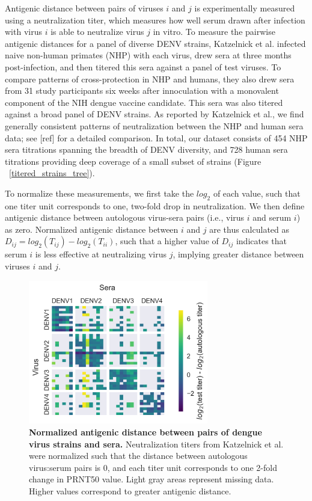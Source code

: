 \documentclass[11pt,oneside,letterpaper]{article}
\begin{document}
Antigenic distance between pairs of viruses $i$ and $j$ is experimentally measured using a neutralization titer, which measures how well serum drawn after infection with virus $i$ is able to neutralize virus $j$ in vitro.
To measure the pairwise antigenic distances for a panel of diverse DENV strains, Katzelnick et al. infected naive non-human primates (NHP) with each virus, drew sera at three months post-infection, and then titered this sera against a panel of test viruses.
To compare patterns of cross-protection in NHP and humans, they also drew sera from 31 study participants six weeks after innoculation with a monovalent component of the NIH dengue vaccine candidate.
This sera was also titered against a broad panel of DENV strains.
As reported by Katzelnick et al., we find generally consistent patterns of neutralization between the NHP and human sera data; see [ref] for a detailed comparison.
In total, our dataset consists of 454 NHP sera titrations spanning the breadth of DENV diversity, and 728 human sera titrations providing deep coverage of a small subset of strains (Figure ~\ref{titered_strains_tree}).

To normalize these measurements, we first take the $log_2$ of each value, such that one titer unit corresponds to one, two-fold drop in neutralization.
We then define antigenic distance between autologous virus-sera pairs (i.e., virus $i$ and serum $i$) as zero.
Normalized antigenic distance between $i$ and $j$ are thus calculated as $D_{ij} = log_2(T_{ij}) - log_2(T_{ii})$, such that a higher value of $D_{ij}$ indicates that serum $i$ is less effective at neutralizing virus $j$, implying greater distance between viruses $i$ and $j$.

\begin{figure}[h]
\begin{centering}
\includegraphics[width=0.7\textwidth]{../figures/png/titer_heatmap.png}
    \caption{\textbf{Normalized antigenic distance between pairs of dengue virus strains and sera.} Neutralization titers from Katzelnick et al. were normalized such that the distance between autologous virus:serum pairs is 0, and each titer unit corresponds to one 2-fold change in PRNT50 value. Light gray areas represent missing data. Higher values correspond to greater antigenic distance.}
     \label{titer_heatmap}
\end{centering}
\end{figure}
\end{document}
